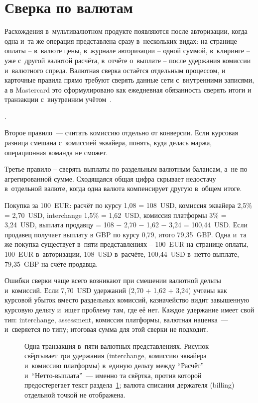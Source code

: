 \section{Сверка по валютам}\label{sec:mc-fx-risk}

Расхождения в~мультивалютном продукте появляются после
авторизации, когда одна и~та же операция представлена сразу
в~нескольких видах: на странице оплаты -- в~валюте цены,
в~журнале авторизации -- одной суммой,
в~клиринге -- уже с~другой валютой расчёта, в~отчёте
о~выплате -- после удержания комиссии и~валютного спреда.
Валютная сверка остаётся отдельным процессом, и карточные правила
прямо требуют сверять данные сети с~внутренними записями,
а в Mastercard это сформулировано как ежедневная обязанность
сверять итоги и транзакции с~внутренним учётом~\cite{mc-rules}.

.

Второе правило~--- считать комиссию отдельно от конверсии.
Если курсовая разница смешана с~комиссией эквайера,
понять, куда делась маржа, операционная команда не сможет.

Третье правило -- сверять выплаты по раздельным валютным балансам, а~не
по агрегированной сумме. Сходящаяся общая цифра скрывает
недостачу в~отдельной валюте, когда одна валюта компенсирует
другую в~общем итоге.

Покупка за 100~EUR: расчёт по курсу 1,08 = 108~USD, комиссия эквайера
2,5\% = 2,70~USD, interchange 1,5\% = 1,62~USD, комиссия
платформы 3\% = 3,24~USD, выплата продавцу =
108 $-$ 2,70 $-$ 1,62 $-$ 3,24 = 100,44~USD. Если продавец
получает выплату в GBP по курсу 0,79, итого 79,35~GBP. Одна
и~та же покупка существует в~пяти представлениях -- 100~EUR на
странице оплаты, 100~EUR в~авторизации, 108~USD в~расчёте,
100,44~USD в~нетто-выплате, 79,35~GBP на счёте продавца.

Ошибки сверки чаще всего возникают при смешении валютной
дельты и~комиссий. Если 7,70~USD удержаний
(2,70 + 1,62 + 3,24) учтены как курсовой убыток вместо
раздельных комиссий, казначейство видит завышенную курсовую
дельту и~ищет проблему там, где её нет. Каждое удержание
имеет свой тип: interchange, assessment, комиссия платформы,
валютная наценка~--- и~сверяется по типу; итоговая сумма для
этой сверки не подходит.

\begin{figure}[tbp]
  \centering
  \caption{Одна транзакция в~пяти валютных представлениях.
    Рисунок свёртывает три удержания (interchange, комиссию эквайера
    и~комиссию платформы) в~единую дельту между \enquote{Расчёт}
    и~\enquote{Нетто-выплата}~--- именно та свёртка, против которой
    предостерегает текст раздела~\ref{sec:mc-fx-risk}; валюта списания
    держателя (billing) отдельной точкой не отображена.}\label{fig:multicurrency-recon}
\end{figure}

